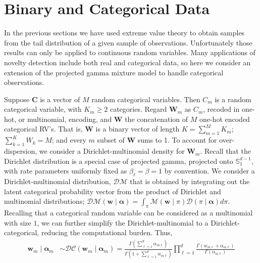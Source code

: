 \section{Binary and Categorical Data\label{sec:categorical}}
In the previous sections we have used extreme value theory to obtain samples
    from the tail distribution of a given sample of observations. Unfortunately 
    those results can only be applied to continuous random variables.  Many 
    applications of novelty detection include both real and categorical 
    data, so here we consider an extension of the projected gamma mixture model 
    to handle categorical observations. 

Suppose $\bm{C}$ is a vector of $M$ random categorical variables.  Then $C_m$ 
    is a random categorical variable, with $K_{m} \geq 2$ categories. Regard 
    $\bm{W}_m$ as $C_m$, recoded in one-hot, or multinomial, encoding, and 
    $\bm{W}$ the concatenation of $M$ one-hot encoded categorical RV's. That is, 
    $\bm{W}$ is a binary vector of length $K = \sum_{m = 1}^M K_{m}$; 
    $\sum_{k = 1}^K W_k = M$; and every $m$ subset of $\bm{W}$ sums to 1.
    To account for over-dispersion, we consider a Dirichlet-multinomial 
    density for $\bm{W}_m$. Recall that the Dirichlet distribution is a 
    special case of projected gamma, projected onto $\mathbb{S}_1^{d-1}$, 
    with rate parameters uniformly fixed as $\beta_{\ell} = \beta = 1$ 
    by convention.  We consider a Dirichlet-multinomial distribution, $\mathcal{DM}$
    that is obtained by integrating out the latent categorical probability vector 
    from the product of Dirichlet and multinomial distributions; 
    $\mathcal{DM}(\bm{w}\mid\bm{\alpha}) = \int_{\pi}\mathcal{M}(\bm{w}\mid\pi)
        \mathcal{D}(\pi\mid\bm{\alpha})d\pi$.
    Recalling that a categorical random variable can be considered as a multinomial 
    with size $1$, we can further simplify the Dirichlet-multinomial to a 
    Dirichlet-categorical, reducing the computational burden. Thus,
    \begin{equation}
        \begin{aligned}
        \label{eqn:dirmultinom}
        \bm{w}_{m}\mid\bm{\alpha}_m 
        &\sim 
        \mathcal{DC}(\bm{w}_m\mid\bm{\alpha}_m) = 
        \frac{\Gamma(\sum_{\ell=1}^d \alpha_{m\ell})}{\Gamma(1 + \sum_{\ell = 1}^d\alpha_{m\ell})}
        \prod_{\ell = 1}^d \frac{\Gamma(w_{m\ell} + \alpha_{m\ell})}{\Gamma(\alpha_{m\ell})}
        \end{aligned}
    \end{equation}
